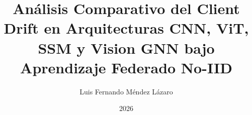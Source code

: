 \documentclass[a4paper,12pt,oneside]{tesisutec}
\begin{document}
\frontmatter


\title{Análisis Comparativo del Client Drift en Arquitecturas CNN, ViT, SSM y Vision GNN bajo Aprendizaje Federado No-IID}

\author{Luis Fernando Méndez Lázaro \texorpdfstring{}{}} %
\date{2026}

\maketitle






\tableofcontents

\newpage

\listoftables

\newpage

\listoffigures


\mainmatter
\pagestyle{fancy}


 







\renewcommand{\bibname}{\hfill\Large\bf{REFERENCIAS BIBLIOGRÁFICAS}\hfill}




\end{document}
